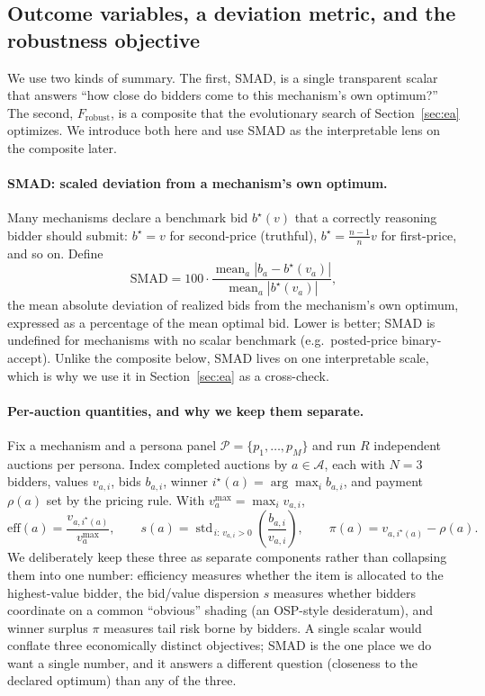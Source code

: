 \documentclass[12pt]{article}
\begin{document}
\subsection{Outcome variables, a deviation metric, and the robustness objective}
\label{sec:fitness}

We use two kinds of summary. The first, SMAD, is a single transparent scalar that
answers ``how close do bidders come to this mechanism's own optimum?'' The second,
$F_{\mathrm{robust}}$, is a composite that the evolutionary search of
Section~\ref{sec:ea} optimizes. We introduce both here and use SMAD as the
interpretable lens on the composite later.

\paragraph{SMAD: scaled deviation from a mechanism's own optimum.} Many mechanisms
declare a benchmark bid $b^\star(v)$ that a correctly reasoning bidder should
submit: $b^\star=v$ for second-price (truthful), $b^\star=\tfrac{n-1}{n}v$ for
first-price, and so on. Define
\begin{equation}
\mathrm{SMAD}=100\cdot\frac{\operatorname{mean}_a|b_a-b^\star(v_a)|}
{\operatorname{mean}_a|b^\star(v_a)|},
\label{eq:smad}
\end{equation}
the mean absolute deviation of realized bids from the mechanism's own optimum,
expressed as a percentage of the mean optimal bid. Lower is better; SMAD is
undefined for mechanisms with no scalar benchmark (e.g.\ posted-price
binary-accept). Unlike the composite below, SMAD lives on one interpretable scale,
which is why we use it in Section~\ref{sec:ea} as a cross-check.

\paragraph{Per-auction quantities, and why we keep them separate.} Fix a mechanism
and a persona panel $\mathcal{P}=\{p_1,\dots,p_M\}$ and run $R$ independent auctions
per persona. Index completed auctions by $a\in\mathcal{A}$, each with $N=3$ bidders,
values $v_{a,i}$, bids $b_{a,i}$, winner $i^\star(a)=\arg\max_i b_{a,i}$, and
payment $\rho(a)$ set by the pricing rule. With $v^{\max}_a=\max_i v_{a,i}$,
\begin{equation}
\mathrm{eff}(a)=\frac{v_{a,i^\star(a)}}{v^{\max}_a},
\qquad
s(a)=\operatorname{std}_{\,i:\,v_{a,i}>0}\!\left(\frac{b_{a,i}}{v_{a,i}}\right),
\qquad
\pi(a)=v_{a,i^\star(a)}-\rho(a).
\label{eq:perauction}
\end{equation}
We deliberately keep these three as separate components rather than collapsing them
into one number: efficiency measures whether the item is allocated to the
highest-value bidder, the bid/value dispersion $s$ measures whether bidders
coordinate on a common ``obvious'' shading (an OSP-style desideratum), and winner
surplus $\pi$ measures tail risk borne by bidders. A single scalar would conflate
three economically distinct objectives; SMAD is the one place we do want a single
number, and it answers a different question (closeness to the declared optimum)
than any of the three.
\end{document}
